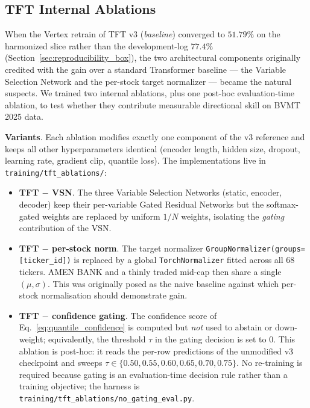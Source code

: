 \documentclass[conference]{IEEEtran}
\begin{document}
\subsection{TFT Internal Ablations}\label{sec:tft_ablations}

When the Vertex retrain of TFT v3 (\textit{baseline}) converged to $51.79\%$ on the harmonized slice rather than the development-log $77.4\%$ (Section~\ref{sec:reproducibility_box}), the two architectural components originally credited with the gain over a standard Transformer baseline --- the Variable Selection Network and the per-stock target normalizer --- became the natural suspects. We trained two internal ablations, plus one post-hoc evaluation-time ablation, to test whether they contribute measurable directional skill on BVMT 2025 data.

\textbf{Variants}. Each ablation modifies exactly one component of the v3 reference and keeps all other hyperparameters identical (encoder length, hidden size, dropout, learning rate, gradient clip, quantile loss). The implementations live in \texttt{training/tft\_ablations/}:
\begin{itemize}
\item \textbf{TFT $-$ VSN}. The three Variable Selection Networks (static, encoder, decoder) keep their per-variable Gated Residual Networks but the softmax-gated weights are replaced by uniform $1/N$ weights, isolating the \emph{gating} contribution of the VSN.
\item \textbf{TFT $-$ per-stock norm}. The target normalizer \texttt{GroupNormalizer(groups=[ticker\_id])} is replaced by a global \texttt{TorchNormalizer} fitted across all $68$ tickers. AMEN BANK and a thinly traded mid-cap then share a single $(\mu, \sigma)$. This was originally posed as the naive baseline against which per-stock normalisation should demonstrate gain.
\item \textbf{TFT $-$ confidence gating}. The confidence score of Eq.~\ref{eq:quantile_confidence} is computed but \emph{not} used to abstain or down-weight; equivalently, the threshold $\tau$ in the gating decision is set to $0$. This ablation is post-hoc: it reads the per-row predictions of the unmodified v3 checkpoint and sweeps $\tau \in \{0.50, 0.55, 0.60, 0.65, 0.70, 0.75\}$. No re-training is required because gating is an evaluation-time decision rule rather than a training objective; the harness is \texttt{training/tft\_ablations/no\_gating\_eval.py}.
\end{itemize}
\end{document}
